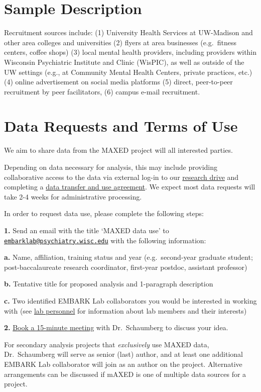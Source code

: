 \documentclass[
]{book}
\begin{document}
\chapter{Sample Description}\label{sample-description}

Recruitment sources include: (1) University Health Services at UW-Madison and other area colleges and universities (2) flyers at area businesses (e.g.~fitness centers, coffee shops) (3) local mental health providers, including providers within Wisconsin Psychiatric Institute and Clinic (WisPIC), as well as outside of the UW settings (e.g., at Community Mental Health Centers, private practices, etc.) (4) online advertisement on social media platforms (5) direct, peer-to-peer recruitment by peer facilitators, (6) campus e-mail recruitment.

\chapter{Data Requests and Terms of Use}\label{data-requests-and-terms-of-use}

We aim to share data from the MAXED project will all interested parties.

Depending on data necessary for analysis, this may include providing collaborative access to the data via external log-in to our \href{https://kb.wisc.edu/researchdata/page.php?id=96642}{research drive} and completing a \href{https://rsp.wisc.edu/contracts/DTUA-De-IdentifiedData.pdf}{data transfer and use agreement}. We expect most data requests will take 2-4 weeks for administrative processing.

In order to request data use, please complete the following steps:

\textbf{1.} Send an email with the title `MAXED data use' to \href{mailto:embarklab@psychiatry.wisc.edu}{\nolinkurl{embarklab@psychiatry.wisc.edu}} with the following information:

\textbf{a.} Name, affiliation, training status and year (e.g.~second-year graduate student; post-baccalaureate research coordinator, first-year postdoc, assistant professor)

\textbf{b.} Tentative title for proposed analysis and 1-paragraph description

\textbf{c.} Two identified EMBARK Lab collaborators you would be interested in working with (see \href{https://embark.psychiatry.wisc.edu/index.php/people/}{lab personnel} for information about lab members and their interests)

\textbf{2.} \href{https://calendly.com/katherine-schaumberg/15min}{Book a 15-minute meeting} with Dr.~Schaumberg to discuss your idea.

For secondary analysis projects that \emph{exclusively} use MAXED data, Dr.~Schaumberg will serve as senior (last) author, and at least one additional EMBARK Lab collaborator will join as an author on the project. Alternative arrangements can be discussed if mAXED is one of multiple data sources for a project.

  
\end{document}
